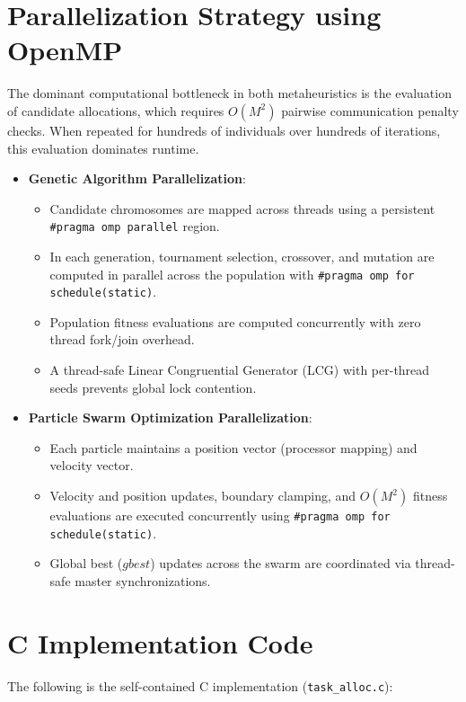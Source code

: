 \documentclass[12pt]{article}
\begin{document}
\section{Parallelization Strategy using OpenMP}
The dominant computational bottleneck in both metaheuristics is the evaluation of candidate allocations, which requires $O(M^2)$ pairwise communication penalty checks. When repeated for hundreds of individuals over hundreds of iterations, this evaluation dominates runtime.
\begin{itemize}
    \item \textbf{Genetic Algorithm Parallelization}:
    \begin{itemize}
        \item Candidate chromosomes are mapped across threads using a persistent \texttt{\#pragma omp parallel} region.
        \item In each generation, tournament selection, crossover, and mutation are computed in parallel across the population with \texttt{\#pragma omp for schedule(static)}.
        \item Population fitness evaluations are computed concurrently with zero thread fork/join overhead.
        \item A thread-safe Linear Congruential Generator (LCG) with per-thread seeds prevents global lock contention.
    \end{itemize}
    \item \textbf{Particle Swarm Optimization Parallelization}:
    \begin{itemize}
        \item Each particle maintains a position vector (processor mapping) and velocity vector.
        \item Velocity and position updates, boundary clamping, and $O(M^2)$ fitness evaluations are executed concurrently using \texttt{\#pragma omp for schedule(static)}.
        \item Global best ($gbest$) updates across the swarm are coordinated via thread-safe master synchronizations.
    \end{itemize}
\end{itemize}

\section{C Implementation Code}
The following is the self-contained C implementation (\texttt{task\_alloc.c}):
\end{document}
